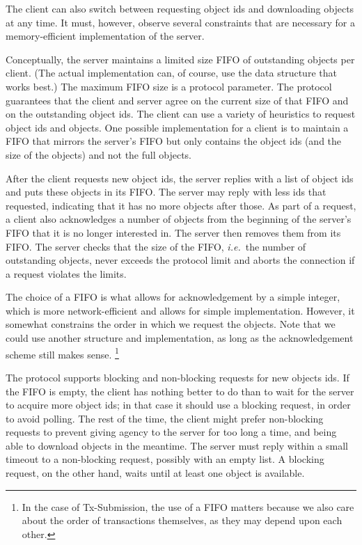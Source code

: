 The client can also switch between requesting object ids and downloading objects
at any time. It must, however, observe several constraints that are necessary
for a memory-efficient implementation of the server.

Conceptually, the server maintains a limited size FIFO of outstanding objects
per client. (The actual implementation can, of course, use the data structure
that works best.) The maximum FIFO size is a protocol parameter. The protocol
guarantees that the client and server agree on the current size of that FIFO and
on the outstanding object ids. The client can use a variety of heuristics to
request object ids and objects. One possible implementation for a client is to
maintain a FIFO that mirrors the server's FIFO but only contains the object ids
(and the size of the objects) and not the full objects.

After the client requests new object ids, the server replies with a list of
object ids and puts these objects in its FIFO. The server may reply with less
ids that requested, indicating that it has no more objects after those. As part
of a request, a client also acknowledges a number of objects from the beginning
of the server's FIFO that it is no longer interested in. The server then removes
them from its FIFO. The server checks that the size of the FIFO, {\em i.e.}\ the
number of outstanding objects, never exceeds the protocol limit and aborts the
connection if a request violates the limits.

The choice of a FIFO is what allows for acknowledgement by a simple integer,
which is more network-efficient and allows for simple implementation. However,
it somewhat constrains the order in which we request the objects. Note that we
could use another structure and implementation, as long as the acknowledgement
scheme still makes sense.%
%
\footnote{In the case of Tx-Submission, the use of a FIFO matters because we
also care about the order of transactions themselves, as they may depend upon
each other.}

The protocol supports blocking and non-blocking requests for new objects ids. If
the FIFO is empty, the client has nothing better to do than to wait for the
server to acquire more object ids; in that case it should use a blocking
request, in order to avoid polling. The rest of the time, the client might
prefer non-blocking requests to prevent giving agency to the server for too long
a time, and being able to download objects in the meantime. The server must
reply within a small timeout to a non-blocking request, possibly with an empty
list. A blocking request, on the other hand, waits until at least one object is
available.

